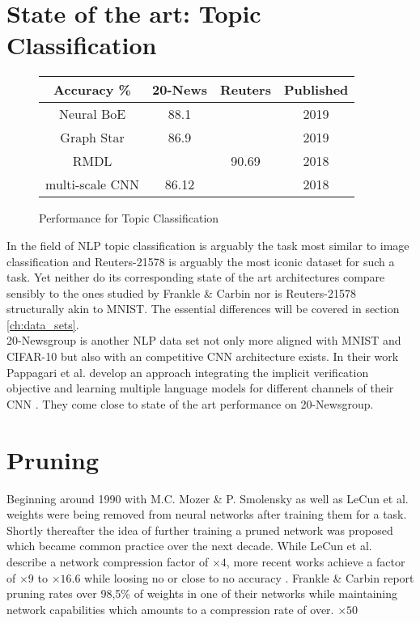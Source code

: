 \section{State of the art: Topic Classification}
\begin{figure}
	\begin{tabular}{c|c|c|c}
		Accuracy \% & 20-News & Reuters & Published\\
		\hline
		Neural BoE & 88.1 &  & 2019 \\
		Graph Star & 86.9 &  & 2019 \\
		RMDL &  & 90.69 & 2018 \\
		\hline
		multi-scale CNN & 86.12 &  & 2018 \\
		
	\end{tabular}
	\caption{Performance for Topic Classification}
\end{figure}
In the field of NLP topic classification is arguably the task most similar to image classification and Reuters-21578 is arguably the most iconic dataset for such a task. Yet neither do its corresponding state of the art architectures compare sensibly to the ones studied by Frankle \& Carbin nor is Reuters-21578 structurally akin to MNIST. The essential differences will be covered in section \ref{ch:data_sets}. \\
20-Newsgroup is another NLP data set not only more aligned with MNIST and CIFAR-10 but also with an competitive CNN architecture exists. In their work Pappagari et al. develop an approach integrating the implicit verification objective and learning multiple language models for different channels of their CNN \cite{End-to-End-CNN}. They come close to state of the art performance on 20-Newsgroup. 

\section{Pruning}
Beginning around 1990 with M.C. Mozer \& P. Smolensky \cite{Skeletonization} as well as LeCun et al. \cite{Optimal-Brain-Damage} weights were being removed from neural networks after training them for a task. Shortly thereafter the idea of further training a pruned network was proposed \cite{Optimal-Brain-Surgeon} which became common practice over the next decade. While LeCun et al. describe a network compression factor of $\times4$, more recent works achieve a factor of $\times9$ to $\times16.6$ while loosing no or close to no accuracy \cite{Learning_Weights_And_Connections} \cite{ThiNet}. Frankle \& Carbin report pruning rates over 98,5\% of weights in one of their networks while maintaining network capabilities which amounts to a compression rate of over. \cite{LTH} $\times50$

